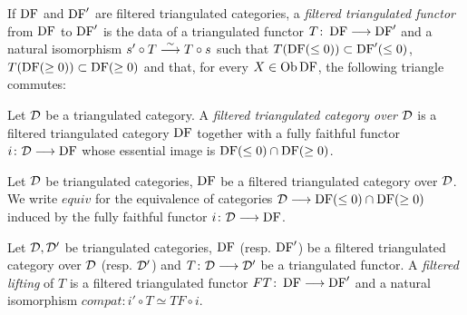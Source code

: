 \begin{definition}
\label{def-FilteredTriangulatedFunctor}
\leanok
{}
If $\operatorname{DF}$ and $\operatorname{DF}'$ are filtered triangulated categories, a \emph{filtered triangulated functor} from $\operatorname{DF}$ to $\operatorname{DF}'$ is the data of a triangulated functor $T\colon \operatorname{DF}\longrightarrow\operatorname{DF}'$ and a natural isomorphism
$s'\circ T\stackrel{\sim}{\longrightarrow} T\circ s$ 
such that $T(\operatorname{DF}(\leq 0))\subset\operatorname{DF}'(\leq 0)$,
$T(\operatorname{DF}(\geq 0))\subset\operatorname{DF}(\geq 0)$ and that, for every $X\in\operatorname{\mathrm{Ob}}\operatorname{DF}$, the following triangle commutes:


\end{definition}


\begin{definition}
\label{def-FilteredTriangulatedOver}
\leanok
{}
Let $\mathcal{D}$ be a triangulated category. A \emph{filtered triangulated category over $\mathcal{D}$} is a filtered triangulated category $\operatorname{DF}$ together 
with a fully faithful functor $i\colon \mathcal{D}\longrightarrow\operatorname{DF}$ whose essential image is $\operatorname{DF}(\leq 0)\cap\operatorname{DF}(\geq 0)$.

\end{definition}

\begin{definition}
\label{def-FilteredTriangulatedOver-equivalence}
\leanok
{}
Let $\mathcal{D}$ be triangulated categories, $\operatorname{DF}$ be a filtered triangulated category over $\mathcal{D}$. We write $equiv$ for the equivalence of categories 
$\mathcal{D}\longrightarrow \operatorname{DF}(\leq 0)\cap\operatorname{DF}(\geq 0)$ induced by the fully faithful functor $i\colon \mathcal{D}\longrightarrow\operatorname{DF}$.

\end{definition}

\begin{definition}
\label{def-FilteredLifting}
\leanok 
{}
Let $\mathcal{D}, \mathcal{D}'$ be triangulated categories, $\operatorname{DF}$ (resp. $\operatorname{DF}'$) be a filtered triangulated category over $\mathcal{D}$ (resp. $\mathcal{D}'$) 
and $T\colon \mathcal{D}\longrightarrow\mathcal{D}'$ be a triangulated functor. A \emph{filtered lifting} of $T$ is a filtered triangulated functor
$FT\colon \operatorname{DF}\longrightarrow\operatorname{DF}'$ and a natural isomorphism $compat : i'\circ T\simeq TF\circ i$.

\end{definition}

